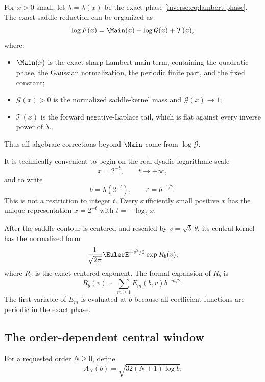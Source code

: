 \documentclass[11pt,oneside]{article}
\theoremstyle{definition}
\theoremstyle{remark}
\begin{document}
For $x>0$ small, let $\lambda=\lambda(x)$ be the exact phase
\eqref{inverse:eq:lambert-phase}.  The exact saddle reduction can be organized as
\begin{equation}
 \log F(x)
 =\Main(x)+\log\mathcal G(x)+\mathcal T(x),
 \label{inverse:eq:exact-saddle-reduction}
\end{equation}
where:
\begin{itemize}
\item $\Main(x)$ is the exact sharp Lambert main term, containing the
quadratic phase, the Gaussian normalization, the periodic finite part, and
the fixed constant;
\item $\mathcal G(x)>0$ is the normalized saddle-kernel mass and
$\mathcal G(x)\to1$;
\item $\mathcal T(x)$ is the forward negative-Laplace tail, which is flat
against every inverse power of $\lambda$.
\end{itemize}
Thus all algebraic corrections beyond $\Main$ come from $\log\mathcal G$.

It is technically convenient to begin on the real dyadic logarithmic
scale
\[
 x=2^{-t},\qquad t\to+\infty,
\]
and to write
\[
 b=\lambda(2^{-t}),\qquad \varepsilon=b^{-1/2}.
\]
This is not a restriction to integer $t$.  Every sufficiently small
positive $x$ has the unique representation $x=2^{-t}$ with
$t=-\log_2x$.

After the saddle contour is centered and rescaled by
$v=\sqrt b\,\theta$, its central kernel has the normalized form
\begin{equation}
 \frac1{\sqrt{2\pi}}\EulerE^{-v^2/2}
 \exp R_b(v), \label{inverse:eq:normalized-central-kernel}
\end{equation}
where $R_b$ is the exact centered exponent.  The formal expansion of
$R_b$ is
\begin{equation}
 R_b(v)\sim\sum_{m\geq1}E_m(b,v)b^{-m/2}.
 \label{inverse:eq:R-formal}
\end{equation}
The first variable of $E_m$ is evaluated at $b$ because all coefficient
functions are periodic in the exact phase.

\subsection{The order-dependent central window}

For a requested order $N\geq0$, define
\begin{equation}
 A_N(b)=\sqrt{32(N+1)\log b}. \label{inverse:eq:central-radius}
\end{equation}
\end{document}
